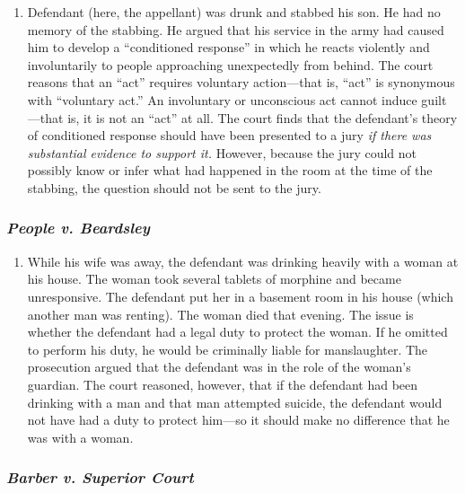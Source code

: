 \begin{enumerate}
    \item Defendant (here, the appellant) was drunk and stabbed his son. He had no memory of the stabbing. He argued that his service in the army had caused him to develop a ``conditioned response'' in which he reacts violently and involuntarily to people approaching unexpectedly from behind. The court reasons that an ``act'' requires voluntary action---that is, ``act'' is synonymous with ``voluntary act.'' An involuntary or unconscious act cannot induce guilt---that is, it is not an ``act'' at all. The court finds that the defendant's theory of conditioned response should have been presented to a jury \emph{if there was substantial evidence to support it.} However, because the jury could not possibly know or infer what had happened in the room at the time of the stabbing, the question should not be sent to the jury.
\end{enumerate}

\subsubsection{\emph{People v. Beardsley}}

\begin{enumerate}
    \item While his wife was away, the defendant was drinking heavily with a woman at his house. The woman took several tablets of morphine and became unresponsive. The defendant put her in a basement room in his house (which another man was renting). The woman died that evening. The issue is whether the defendant had a legal duty to protect the woman. If he omitted to perform his duty, he would be criminally liable for manslaughter. The prosecution argued that the defendant was in the role of the woman's guardian. The court reasoned, however, that if the defendant had been drinking with a man and that man attempted suicide, the defendant would not have had a duty to protect him---so it should make no difference that he was with a woman.
\end{enumerate}

\subsubsection{\emph{Barber v. Superior Court}}

